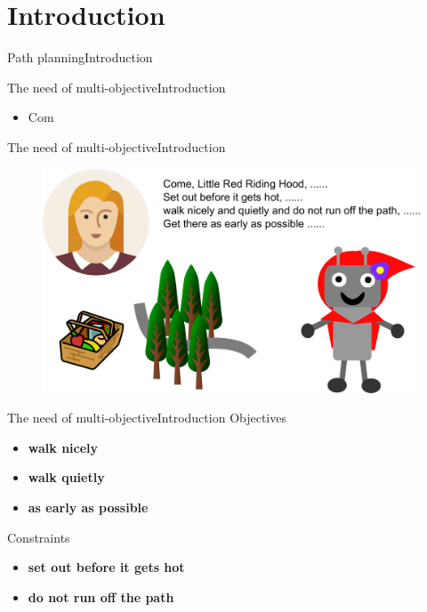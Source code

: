 \section{Introduction}

\begin{frame}{Path planning}{Introduction}
\end{frame}

\begin{frame}{The need of multi-objective}{Introduction}
\begin{itemize}
\item Com
\end{itemize}
\end{frame}

\begin{frame}{The need of multi-objective}{Introduction}
	\begin{figure}
		\centering
		\includegraphics[width=\linewidth]{figure/task_assign}
		\label{fig:task_assign}
	\end{figure}
\end{frame}

\begin{frame}{The need of multi-objective}{Introduction}
Objectives
\begin{itemize}
\item \textbf{walk nicely}
\item \textbf{walk quietly}
\item \textbf{as early as possible}
\end{itemize}
Constraints
\begin{itemize}
\item  \textbf{set out before it gets hot}
\item \textbf{do not run off the path}
\end{itemize}
\end{frame}

